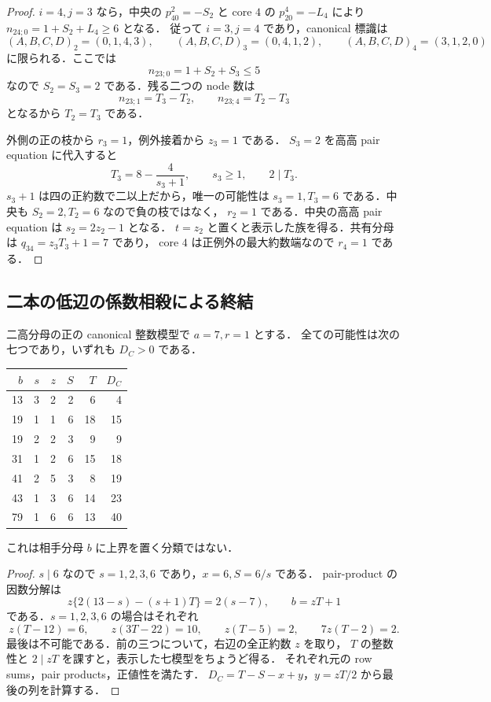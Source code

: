 \begin{proof}
$i=4,j=3$ なら，中央の $p^2_{40}=-S_2$ と
core $4$ の $p^4_{20}=-L_4$ により
$n_{24;0}=1+S_2+L_4\ge6$ となる．
従って $i=3,j=4$ であり，canonical 標識は
\[
 (A,B,C,D)_2=(0,1,4,3),\qquad
 (A,B,C,D)_3=(0,4,1,2),\qquad
 (A,B,C,D)_4=(3,1,2,0)
\]
に限られる．ここでは
\[
 n_{23;0}=1+S_2+S_3\le5
\]
なので $S_2=S_3=2$ である．残る二つの node 数は
\[
 n_{23;1}=T_3-T_2,\qquad n_{23;4}=T_2-T_3
\]
となるから $T_2=T_3$ である．

外側の正の枝から $r_3=1$，例外接着から $z_3=1$ である．
$S_3=2$ を高高 pair equation に代入すると
\[
 T_3=8-\frac4{s_3+1},\qquad s_3\ge1,\qquad 2\mid T_3.
\]
$s_3+1$ は四の正約数で二以上だから，唯一の可能性は
$s_3=1,T_3=6$ である．中央も $S_2=2,T_2=6$ なので負の枝ではなく，
$r_2=1$ である．中央の高高 pair equation は $s_2=2z_2-1$ となる．
$t=z_2$ と置くと表示した族を得る．共有分母は $q_{34}=z_3T_3+1=7$ であり，
core $4$ は正例外の最大約数端なので $r_4=1$ である．
\end{proof}

\subsection{二本の低辺の係数相殺による終結}

\begin{lemma}[固定した $a=7,r=1$ の完全な七模型]
\label{hs18:fixed-seven}
二高分母の正の canonical 整数模型で $a=7,r=1$ とする．
全ての可能性は次の七つであり，いずれも $D_C>0$ である．
\begin{center}
\begin{tabular}{rrrrr|r}
$b$&$s$&$z$&$S$&$T$&$D_C$\\\hline
13&3&2&2&6&4\\
19&1&1&6&18&15\\
19&2&2&3&9&9\\
31&1&2&6&15&18\\
41&2&5&3&8&19\\
43&1&3&6&14&23\\
79&1&6&6&13&40
\end{tabular}
\end{center}
これは相手分母 $b$ に上界を置く分類ではない．
\end{lemma}

\begin{proof}
$s\mid6$ なので $s=1,2,3,6$ であり，$x=6,S=6/s$ である．
pair-product の因数分解は
\[
 z\{2(13-s)-(s+1)T\}=2(s-7),\qquad b=zT+1
\]
である．$s=1,2,3,6$ の場合はそれぞれ
\[
 z(T-12)=6,\qquad z(3T-22)=10,\qquad
 z(T-5)=2,\qquad 7z(T-2)=2.
\]
最後は不可能である．前の三つについて，右辺の全正約数 $z$ を取り，
$T$ の整数性と $2\mid zT$ を課すと，表示した七模型をちょうど得る．
それぞれ元の row sums，pair products，正値性を満たす．
$D_C=T-S-x+y$，$y=zT/2$ から最後の列を計算する．
\end{proof}

